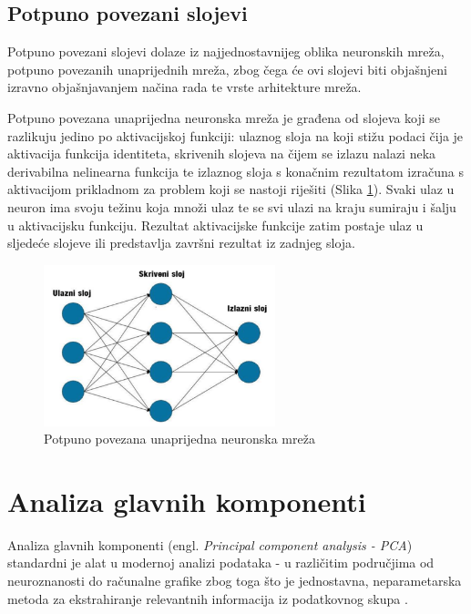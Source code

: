 \documentclass[times, utf8, proizvoljni, numeric]{fer}
\begin{document}
\subsection{Potpuno povezani slojevi}

Potpuno povezani slojevi dolaze iz najjednostavnijeg oblika neuronskih mreža, potpuno povezanih unaprijednih mreža, zbog čega će ovi slojevi biti objašnjeni izravno objašnjavanjem načina rada te vrste arhitekture mreža.
 
Potpuno povezana unaprijedna neuronska mreža je građena od slojeva koji se razlikuju jedino po aktivacijskoj funkciji: ulaznog sloja na koji stižu podaci čija je aktivacija funkcija identiteta, skrivenih slojeva na čijem se izlazu nalazi neka derivabilna nelinearna funkcija te izlaznog sloja s konačnim rezultatom izračuna s aktivacijom prikladnom za problem koji se nastoji riješiti (Slika \ref{fg:potpuno_povezana}). Svaki ulaz u neuron ima svoju težinu koja množi ulaz te se svi ulazi na kraju sumiraju i šalju u aktivacijsku funkciju. Rezultat aktivacijske funkcije zatim postaje ulaz u sljedeće slojeve ili predstavlja završni rezultat iz zadnjeg sloja.

\begin{figure}[!ht]
	\begin{center}
		\captionsetup{justification=centering}
		\includegraphics[width=0.6\textwidth]{./imgs/potpuno_povezana.png}
		\caption{Potpuno povezana unaprijedna neuronska mreža}
		\label{fg:potpuno_povezana}
	\end{center}
\end{figure}

\section{Analiza glavnih komponenti}

Analiza glavnih komponenti (engl. \textit{Principal component analysis - PCA}) standardni je alat u modernoj analizi podataka - u različitim područjima od neuroznanosti do računalne grafike zbog toga što je jednostavna, neparametarska metoda za ekstrahiranje relevantnih informacija iz podatkovnog skupa \cite{PCA}.
\end{document}
